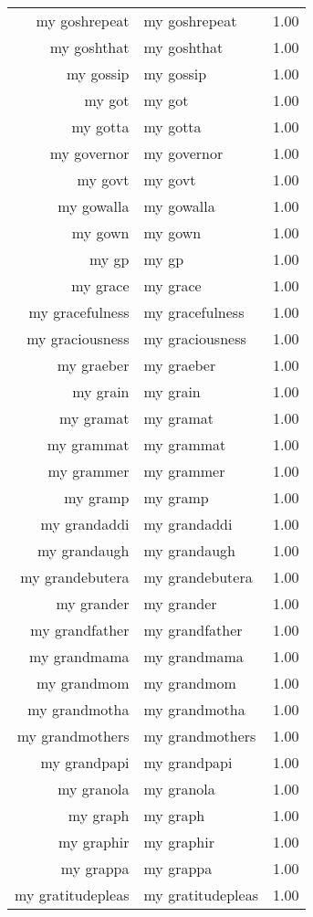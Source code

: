 \begin{table}[ht]
\begin{tabular}{rlr}
  my goshrepeat & my goshrepeat & 1.00 \\ 
  my goshthat & my goshthat & 1.00 \\ 
  my gossip & my gossip & 1.00 \\ 
  my got & my got & 1.00 \\ 
  my gotta & my gotta & 1.00 \\ 
  my governor & my governor & 1.00 \\ 
  my govt & my govt & 1.00 \\ 
  my gowalla & my gowalla & 1.00 \\ 
  my gown & my gown & 1.00 \\ 
  my gp & my gp & 1.00 \\ 
  my grace & my grace & 1.00 \\ 
  my gracefulness & my gracefulness & 1.00 \\ 
  my graciousness & my graciousness & 1.00 \\ 
  my graeber & my graeber & 1.00 \\ 
  my grain & my grain & 1.00 \\ 
  my gramat & my gramat & 1.00 \\ 
  my grammat & my grammat & 1.00 \\ 
  my grammer & my grammer & 1.00 \\ 
  my gramp & my gramp & 1.00 \\ 
  my grandaddi & my grandaddi & 1.00 \\ 
  my grandaugh & my grandaugh & 1.00 \\ 
  my grandebutera & my grandebutera & 1.00 \\ 
  my grander & my grander & 1.00 \\ 
  my grandfather & my grandfather & 1.00 \\ 
  my grandmama & my grandmama & 1.00 \\ 
  my grandmom & my grandmom & 1.00 \\ 
  my grandmotha & my grandmotha & 1.00 \\ 
  my grandmothers & my grandmothers & 1.00 \\ 
  my grandpapi & my grandpapi & 1.00 \\ 
  my granola & my granola & 1.00 \\ 
  my graph & my graph & 1.00 \\ 
  my graphir & my graphir & 1.00 \\ 
  my grappa & my grappa & 1.00 \\ 
  my gratitudepleas & my gratitudepleas & 1.00 \\ 

\end{tabular}
\end{table}
